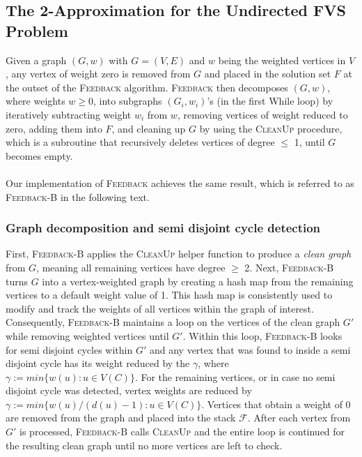 \subsection{The 2-Approximation for the Undirected FVS Problem}%
\label{sec:2approx}
Given a graph $(G, w)$ with $G = (V,E)$ and $w$ being the weighted vertices in $V$, any vertex of weight zero is removed from $G$ and placed in the solution set $F$ at the outset of the \textsc{Feedback} algorithm. \textsc{Feedback} then decomposes $(G, w)$, where weights $w \geq 0$, into subgraphs $(G_i, w_i)$’s (in the first While loop) by iteratively subtracting weight $w_i$ from $w$, removing vertices of weight reduced to zero, adding them into $F$, and cleaning up $G$ by using the \textsc{CleanUp} procedure, which is a subroutine that recursively deletes vertices of degree $\leq$ 1, until $G$ becomes empty.\\\\
Our implementation of \textsc{Feedback}\cite{approx} achieves the same result, which is referred to as \textsc{Feedback-B} in the following text.
\subsubsection{Graph decomposition and semi disjoint cycle detection} 
First, \textsc{Feedback-B} applies the \textsc{CleanUp} helper function to produce a \textit{clean graph} from $G$, meaning all remaining vertices have degree $\geq$ 2. Next, \textsc{Feedback-B} turns $G$ into a vertex-weighted graph by creating a hash map from the remaining vertices to a default weight value of 1. This hash map is consistently used to modify and track the weights of all vertices within the graph of interest. Consequently, \textsc{Feedback-B} maintains a loop on the vertices of the clean graph $G'$ while removing weighted vertices until $G'$. Within this loop, \textsc{Feedback-B} looks for semi disjoint cycles within $G'$ and any vertex that was found to inside a semi disjoint cycle has its weight reduced by the $\gamma$, where $\gamma := min\{w(u) : u \in V (C)\}$. For the remaining vertices, or in case no semi disjoint cycle was detected, vertex weights are reduced by $\gamma := min\{w(u)/(d(u)-1) : u \in V (C)\}$. Vertices that obtain a weight of 0 are removed from the graph and placed into the stack $\mathcal{F}$. After each vertex from $G'$ is processed, \textsc{Feedback-B} calls \textsc{CleanUp} and the entire loop is continued for the resulting clean graph until no more vertices are left to check.

